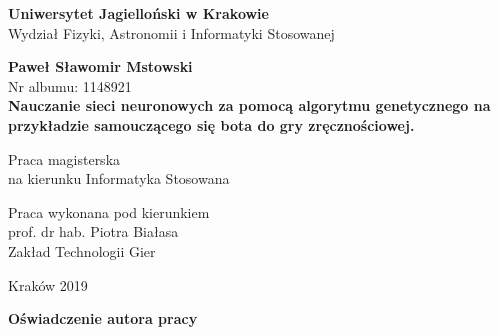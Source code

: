 \documentclass[12pt, oneside]{report}
\begin{document}
  
\thispagestyle{empty}
\begin{titlepage}
    \begin{center}

           \Large
	\textbf{Uniwersytet Jagielloński w Krakowie}\vspace{0.2cm}\\ Wydział Fizyki, Astronomii i Informatyki Stosowanej
               \vspace*{1cm}
               
         \vspace{3cm}
         \Large
          \textbf{Paweł Sławomir Mstowski}\\\vspace{0.5cm}
         \normalsize Nr albumu: 1148921\\
             \vspace{2cm}
        \Huge
        \textbf{Nauczanie sieci neuronowych za pomocą algorytmu genetycznego na przykładzie samouczącego się bota do gry zręcznościowej.}
      
        \vspace{1.5cm}
        \normalsize
        Praca magisterska\\
        na kierunku Informatyka Stosowana\\ \vspace{0.15cm}
        
        \vfill
        \vspace{2cm}
       \begin{minipage}{1\textwidth}
\begin{flushright}
Praca wykonana pod kierunkiem\\
prof. dr hab. Piotra Białasa\\
Zakład Technologii Gier
\end{flushright}
\end{minipage}
        
        \vspace{2cm}
        \begin{center}
      Kraków 2019
        \end{center}
    \end{center}
\end{titlepage}

\newpage 
 \thispagestyle{empty}
\vspace{2.5cm}
\begin{flushleft}
\large \textbf{Oświadczenie autora pracy}\vspace{0.6cm}\\
\end{flushleft}
\end{document}
